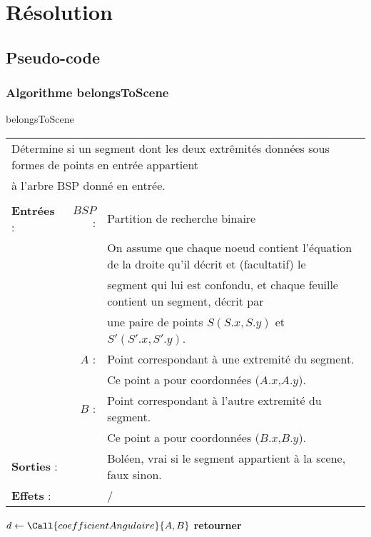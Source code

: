\documentclass[10pt]{article}
\begin{document}
\newpage
\section{Résolution}
\subsection{Pseudo-code}
\subsubsection{Algorithme belongsToScene}
\begin{algorithm}[!h]
\caption{belongsToScene}
\begin{tabular}{lrl}
\multicolumn{3}{l}{Détermine si un segment dont les deux extrêmités données sous formes de points en entrée appartient}\\
\multicolumn{3}{l}{à l'arbre BSP donné en entrée.}\\
&&\\
\textbf{Entrées} : &$BSP$ : &Partition de recherche binaire\\
& &On assume que chaque noeud contient l'équation de la droite qu'il décrit et (facultatif) le\\ 
& &segment qui lui est confondu, et chaque feuille contient un segment, décrit par\\
& &une paire de points $S(S.x,S.y)$ et $S'(S'.x,S'.y)$.\\ 
&$A$ : &Point correspondant à une extremité du segment.\\
& &Ce point a pour coordonnées ($A.x$,$A.y$).\\
&$B$ : &Point correspondant à l'autre extremité du segment.\\
& &Ce point a pour coordonnées ($B.x$,$B.y$).\\
\textbf{Sorties} :& &Boléen, vrai si le segment appartient à la scene, faux sinon.\\
\textbf{Effets} :& &/
\end{tabular}
\begin{algorithmic}[1]
\State $d\gets\Call{coefficientAngulaire}{A,B}$
\State \textbf{retourner} 
\EndProcedure
\end{algorithmic}
\end{algorithm}
\end{document}
